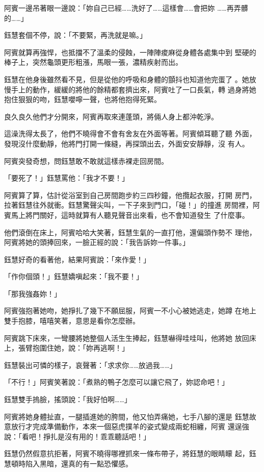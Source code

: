 阿賓一邊吊著眼一邊說：「妳自己已經……洗好了……這樣會……會把妳
……再弄髒的……」

鈺慧套個不停，說：「不要緊，再洗就是嘛。」

阿賓就算再強悍，也抵擋不了溫柔的侵蝕，一陣陣痠麻從身體各處集中到
堅硬的棒子上，突然龜頭更形粗漲，馬眼一張，濃精疾射而出。

鈺慧在他身後雖然看不見，但是從他的呼吸和身體的顫抖也知道他完蛋了
。她放慢手上的動作，緩緩的將他的餘精都套擠出來，阿賓吐了一口長氣，轉
過身將她抱住狠狠的吻，鈺慧嚶嚀一聲，也將他抱得死緊。

良久良久他們才分開來，阿賓再取來連蓬頭，將倆人身上都沖乾淨。

這澡洗得太長了，他們不曉得會不會有舍友在外面等著。阿賓傾耳聽了聽
外面，發現沒什麼動靜，他將門打開一條縫，再探頭出去，外面安安靜靜，沒
有人。

阿賓突發奇想，問鈺慧敢不敢就這樣赤裸走回房間。

「要死了！」鈺慧罵他：「我才不要！」

阿賓算了算，估計從浴室到自己房間跑步約三四秒鐘，他攬起衣服，打開
房門，拉著鈺慧往外就衝。鈺慧驚聲尖叫，一下子來到門口，「碰！」的撞進
房間裡，阿賓馬上將門關好，這時就算有人聽見聲音出來看，也不會知道發生
了什麼事。

他們滾倒在床上，阿賓哈哈大笑著，鈺慧生氣的一直打他，還偏頭作勢不
理他，阿賓將她的頭捧回來，一臉正經的說：「我告訴妳一件事。」

鈺慧好奇的看著他，結果阿賓說：「來作愛！」

「作你個頭！」鈺慧嬌嗔起來：「我不要！」

「那我強姦妳！」

阿賓強抱著她吻，她掙扎了幾下不願屈服，阿賓一不小心被她逃走，她蹲
在地上雙手抱膝，嘻嘻笑著，意思是看你怎麼辦。

阿賓跳下床來，一彎腰將她整個人活生生捧起，鈺慧嚇得哇哇叫，他將她
放回床上，張臂抱圍住她，說：「妳再逃啊！」

鈺慧裝出可憐的樣子，哀聲著：「求求你……放過我……」

「不行！」阿賓笑著說：「煮熟的鴨子怎麼可以讓它飛了，妳認命吧！」

鈺慧雙手摀臉，搖頭說：「我好怕啊……」

阿賓將她身體扯直，一腿插進她的胯間，他又怕弄痛她，七手八腳的還是
鈺慧故意放行才完成準備動作，本來一個惡虎撲羊的姿式變成兩蛇相纏，阿賓
還逞強說：「看吧！掙扎是沒有用的！乖乖聽話吧！」

鈺慧仍然假意抗拒著，阿賓不曉得哪裡抓來一條布帶子，將鈺慧的眼睛矇
起，鈺慧頓時陷入黑暗，還真的有一點恐懼感。

